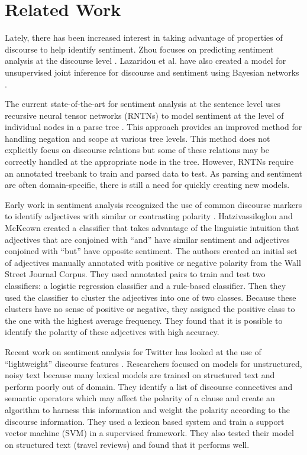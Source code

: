 \documentclass[11pt,letterpaper]{article}
\begin{document}
\section{Related Work}

Lately, there has been increased interest in taking advantage of properties of discourse to help identify sentiment.
Zhou focuses on predicting
sentiment analysis at the discourse level \cite{Zhou}. 
Lazaridou et al. have also created a model for unsupervised joint inference for
discourse and sentiment using Bayesian networks \cite{Lazaridou}.

The current state-of-the-art for sentiment analysis at the sentence level uses recursive neural tensor networks (RNTNs) to model sentiment 
at the level of individual nodes in a parse tree \cite{Socher}.  This approach provides an improved method for handling negation and scope at various tree levels.
This method does not explicitly focus on discourse relations but some of these relations may be correctly handled at the appropriate node in the tree.
However, RNTNs require an annotated treebank to train and parsed data to test.  As parsing and sentiment are often domain-specific, there is still a
need for quickly creating new models.

Early work in sentiment analysis recognized the use of common discourse markers to identify adjectives with similar or contrasting polarity \cite{Hatzi}.
Hatzivassiloglou and McKeown created a classifier that takes advantage of the
linguistic intuition that adjectives that are conjoined with ``and'' have similar sentiment
and adjectives conjoined with ``but'' have opposite sentiment.  The authors
created an initial set of adjectives manually annotated with positive or negative
polarity from the Wall Street Journal Corpus. They used annotated pairs to train
and test two classifiers: a logistic regression classifier and a rule-based classifier.
Then they used the classifier to cluster the adjectives into one of two classes. Because
these clusters have no sense of positive or negative, they assigned the positive
class to the one with the highest average frequency.  They found that it is possible to identify the polarity of these adjectives
with high accuracy.

Recent work on sentiment analysis for Twitter has looked at the use of ``lightweight'' discourse features \cite{Mukherjee}.
Researchers focused on models for unstructured, noisy text because many lexical models are trained on structured text and perform poorly out of domain.
They identify a list of discourse connectives and semantic operators which may affect the polarity of a clause and create an algorithm to harness this information
and weight the polarity according to the discourse information.
They used a lexicon based system and train a support vector machine (SVM) in a supervised framework.
They also tested their model on structured text (travel reviews) and found that it performs well.
\end{document}
